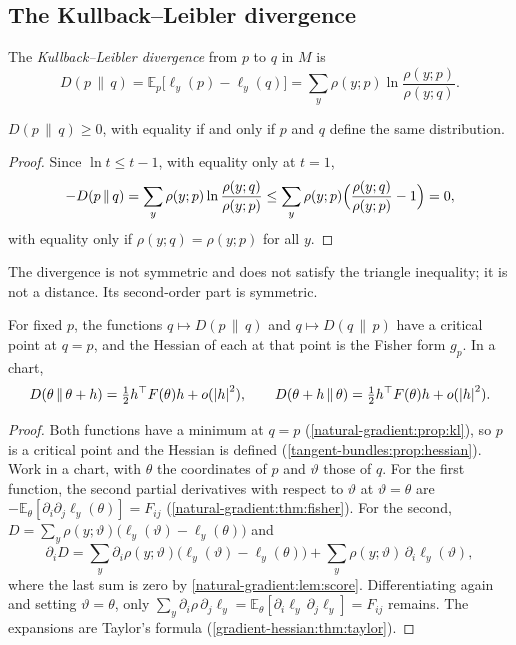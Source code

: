\begin{notechapter}
\section{The Kullback--Leibler divergence}\label{natural-gradient:sec:kl}

\begin{definition}\label{natural-gradient:def:kl}
The \emph{Kullback--Leibler divergence} from $p$ to $q$ in $M$ is
\[
  D(p\,\|\,q) = \mathbb E_p\bigl[\ell_y(p) - \ell_y(q)\bigr]
  = \sum_y\rho(y; p)\ln\frac{\rho(y; p)}{\rho(y; q)} .
\]
\end{definition}

\begin{proposition}\label{natural-gradient:prop:kl}
$D(p\,\|\,q)\geq0$, with equality if and only if $p$ and $q$ define the
same distribution.
\end{proposition}

\begin{proof}
Since $\ln t\leq t - 1$, with equality only at $t = 1$,
\[
  -D(p\,\|\,q) = \sum_y\rho(y; p)\ln\frac{\rho(y; q)}{\rho(y; p)}
  \leq\sum_y\rho(y; p)\Bigl(\frac{\rho(y; q)}{\rho(y; p)} - 1\Bigr) = 0 ,
\]
with equality only if $\rho(y; q) = \rho(y; p)$ for all $y$.
\end{proof}

The divergence is not symmetric and does not satisfy the triangle
inequality; it is not a distance. Its second-order part is symmetric.

\begin{theorem}
\label{natural-gradient:thm:kl}
For fixed $p$, the functions $q\mapsto D(p\,\|\,q)$ and
$q\mapsto D(q\,\|\,p)$ have a critical point at $q = p$, and the Hessian
of each at that point is the Fisher form $g_p$. In a chart,
\[
  D(\theta\,\|\,\theta + h) = \tfrac12h^\top F(\theta)h + o(\left|h\right|^2) ,
  \qquad
  D(\theta + h\,\|\,\theta) = \tfrac12h^\top F(\theta)h + o(\left|h\right|^2) .
\]
\end{theorem}

\begin{proof}
Both functions have a minimum at $q = p$
(\cref{natural-gradient:prop:kl}), so $p$ is a critical point and the
Hessian is defined (\cref{tangent-bundles:prop:hessian}). Work in a
chart, with $\theta$ the coordinates of $p$ and $\vartheta$ those of $q$.
For the first function, the second partial derivatives with respect to
$\vartheta$ at $\vartheta = \theta$ are
$-\mathbb E_\theta[\partial_i\partial_j\ell_y(\theta)] = F_{ij}$
(\cref{natural-gradient:thm:fisher}). For the second,
$D = \sum_y\rho(y; \vartheta)\bigl(\ell_y(\vartheta) - \ell_y(\theta)\bigr)$
and
\[
  \partial_iD
  = \sum_y\partial_i\rho(y; \vartheta)
    \bigl(\ell_y(\vartheta) - \ell_y(\theta)\bigr)
  + \sum_y\rho(y; \vartheta)\,\partial_i\ell_y(\vartheta) ,
\]
where the last sum is zero by \cref{natural-gradient:lem:score}.
Differentiating again and setting $\vartheta = \theta$, only
$\sum_y\partial_i\rho\,\partial_j\ell_y
= \mathbb E_\theta[\partial_i\ell_y\,\partial_j\ell_y] = F_{ij}$ remains.
The expansions are Taylor's formula
(\cref{gradient-hessian:thm:taylor}).
\end{proof}


\end{notechapter}
